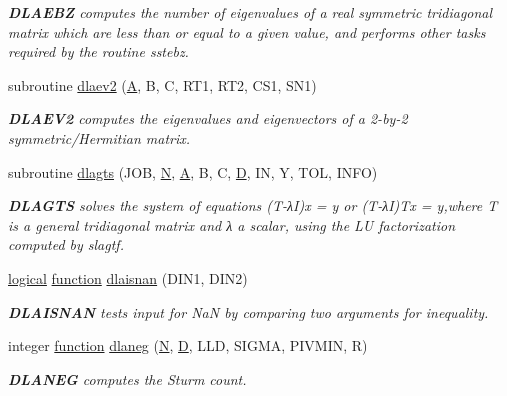 \begin{DoxyCompactItemize}
\begin{DoxyCompactList}\small\item\em {\bfseries D\+L\+A\+E\+B\+Z} computes the number of eigenvalues of a real symmetric tridiagonal matrix which are less than or equal to a given value, and performs other tasks required by the routine sstebz. \end{DoxyCompactList}\item 
subroutine \hyperlink{group__auxOTHERauxiliary_ga404759a75990a78660c741b3448b27e8}{dlaev2} (\hyperlink{classA}{A}, B, C, R\+T1, R\+T2, C\+S1, S\+N1)
\begin{DoxyCompactList}\small\item\em {\bfseries D\+L\+A\+E\+V2} computes the eigenvalues and eigenvectors of a 2-\/by-\/2 symmetric/\+Hermitian matrix. \end{DoxyCompactList}\item 
subroutine \hyperlink{group__auxOTHERauxiliary_ga0fbc9a87ffa4a60adadcb4fc511c2556}{dlagts} (J\+O\+B, \hyperlink{polmisc_8c_a0240ac851181b84ac374872dc5434ee4}{N}, \hyperlink{classA}{A}, B, C, \hyperlink{odrpack_8h_a7dae6ea403d00f3687f24a874e67d139}{D}, I\+N, Y, T\+O\+L, I\+N\+F\+O)
\begin{DoxyCompactList}\small\item\em {\bfseries D\+L\+A\+G\+T\+S} solves the system of equations (T-\/λ\+I)x = y or (T-\/λ\+I)Tx = y,where T is a general tridiagonal matrix and λ a scalar, using the L\+U factorization computed by slagtf. \end{DoxyCompactList}\item 
\hyperlink{tnc_8c_aa7b64cdf39500931f7b333343791a104}{logical} \hyperlink{afunc_8m_a7b5e596df91eadea6c537c0825e894a7}{function} \hyperlink{group__auxOTHERauxiliary_ga341ec834c6fc14a17fead550ff486022}{dlaisnan} (D\+I\+N1, D\+I\+N2)
\begin{DoxyCompactList}\small\item\em {\bfseries D\+L\+A\+I\+S\+N\+A\+N} tests input for Na\+N by comparing two arguments for inequality. \end{DoxyCompactList}\item 
integer \hyperlink{afunc_8m_a7b5e596df91eadea6c537c0825e894a7}{function} \hyperlink{group__auxOTHERauxiliary_ga4932b5966e6a63f7d7b9f0a189003b6e}{dlaneg} (\hyperlink{polmisc_8c_a0240ac851181b84ac374872dc5434ee4}{N}, \hyperlink{odrpack_8h_a7dae6ea403d00f3687f24a874e67d139}{D}, L\+L\+D, S\+I\+G\+M\+A, P\+I\+V\+M\+I\+N, R)
\begin{DoxyCompactList}\small\item\em {\bfseries D\+L\+A\+N\+E\+G} computes the Sturm count. \end{DoxyCompactList}\item 

\end{DoxyCompactItemize}
